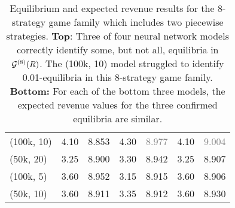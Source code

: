 \begin{table}[ht]
\begin{tabular}{l|cc|cc|cc|}
(100k, 10) & 4.10  & 8.853 & 4.30  & \textcolor{gray}{8.977} & 4.10 & \textcolor{gray}{9.004} \\
(50k, 20)  & 3.25  & 8.900 & 3.30  & 8.942 & 3.25 & 8.907 \\
(100k, 5)  & 3.60  & 8.952 & 3.15  & 8.915 & 3.60  & 8.906 \\
(50k, 10)  & 3.60  & 8.911 & 3.35  & 8.912 & 3.60  & 8.930 \\
\end{tabular}
\caption{Equilibrium and expected revenue results for the 8-strategy game family which includes two piecewise strategies. \textbf{Top}: Three of four neural network models correctly identify some, but not all, equilibria in $\mathcal{G}^{(8)}(R)$. The (100k, 10) model struggled to identify 0.01-equilibria in this 8-strategy game family. \textbf{Bottom:} For each of the bottom three models, the expected revenue values for the three confirmed equilibria are similar.}
\label{iter1_iter2_results}
\end{table}
